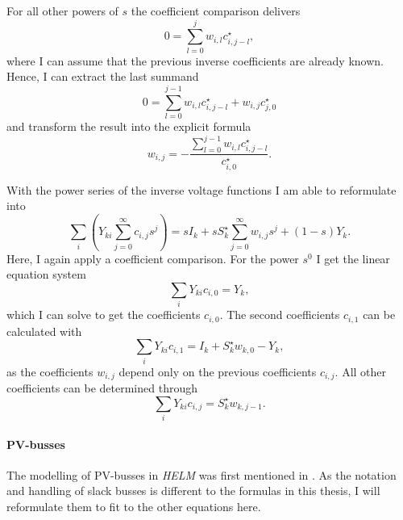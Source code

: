 For all other powers of $s$ the coefficient comparison delivers
\begin{equation}
	0 = \sum_{l = 0}^j w_{i,l} c_{i,j - l}^\star,
\end{equation}
where I can assume that the previous inverse coefficients are already known. Hence, I can extract the last summand
\begin{equation}
	0 = \sum_{l = 0}^{j - 1} w_{i,l} c_{i,j - l}^\star + w_{i,j} c_{j,0}^\star
\end{equation}
and transform the result into the explicit formula 
\begin{equation}
	w_{i,j} = - \frac{\sum_{l = 0}^{j - 1} w_{i,l} c_{i,j - l}^\star}{c_{i,0}^\star}.
\end{equation}

With the power series of the inverse voltage functions I am able to reformulate  into
\begin{equation}
	\sum_i \left( Y_{ki} \sum_{j = 0}^\infty c_{i,j} s^j \right) = s I_k + s S_k^\star \sum_{j = 0}^\infty w_{i,j} s^j + (1 - s) Y_k.
\end{equation}
Here, I again apply a coefficient comparison. For the power $s^0$ I get the linear equation system
\begin{equation}
	\sum_i Y_{ki} c_{i,0} = Y_k,
	\label{eq:helm_first_coefficients}
\end{equation}
which I can solve to get the coefficients $c_{i,0}$. The second coefficients $c_{i,1}$ can be calculated with
\begin{equation}
	\sum_i Y_{ki} c_{i,1} = I_k + S_k^\star w_{k,0} - Y_k,
	\label{eq:helm_second_coefficients}
\end{equation}
as the coefficients $w_{i,j}$ depend only on the previous coefficients $c_{i,j}$. All other coefficients can be determined through
\begin{equation}
	\sum_i Y_{ki} c_{i,j} = S_k^\star w_{k,j - 1}.
	\label{eq:helm_other_coefficients}
\end{equation}

\paragraph{PV-busses}

The modelling of PV-busses in \emph{HELM} was first mentioned in \citep{helmPV}. As the notation and handling of slack busses is different to the formulas in this thesis, I will reformulate them to fit to the other equations here.

